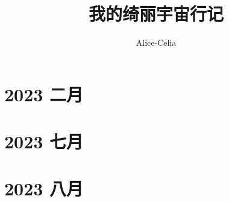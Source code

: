 \documentclass[UTF8]{ctexbook}
\title{\Huge 我的绮丽宇宙行记}
\author{Alice-Celia}
\date{\zhtoday}
\begin{document}
\maketitle


\section*{2023 二月}






\section*{2023 七月}



\section*{2023 八月}

\end{document}
